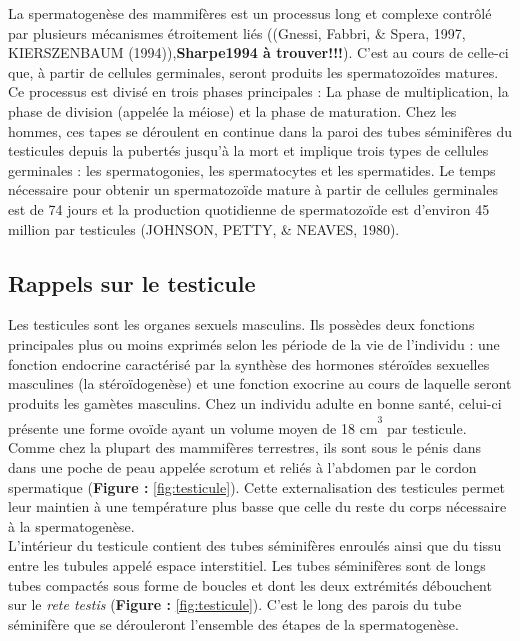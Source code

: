 \documentclass[12pt,twoside]{reedthesis}
\theoremstyle{definition}
\theoremstyle{definition}
\theoremstyle{remark}
\begin{document}
  La spermatogenèse des mammifères est un processus long et complexe
  contrôlé par plusieurs mécanismes étroitement liés ((Gnessi, Fabbri, \&
  Spera, 1997, KIERSZENBAUM (1994)),\textbf{Sharpe1994 à trouver!!!}).
  C'est au cours de celle-ci que, à partir de cellules germinales, seront
  produits les spermatozoïdes matures. Ce processus est divisé en trois
  phases principales : La phase de multiplication, la phase de division
  (appelée la méiose) et la phase de maturation. Chez les hommes, ces
  tapes se déroulent en continue dans la paroi des tubes séminifères du
  testicules depuis la pubertés jusqu'à la mort et implique trois types de
  cellules germinales : les spermatogonies, les spermatocytes et les
  spermatides. Le temps nécessaire pour obtenir un spermatozoïde mature à
  partir de cellules germinales est de 74 jours et la production
  quotidienne de spermatozoïde est d'environ 45 million par testicules
  (JOHNSON, PETTY, \& NEAVES, 1980).
  
  \subsection{Rappels sur le testicule}\label{rappels-sur-le-testicule}
  
  Les testicules sont les organes sexuels masculins. Ils possèdes deux
  fonctions principales plus ou moins exprimés selon les période de la vie
  de l'individu : une fonction endocrine caractérisé par la synthèse des
  hormones stéroïdes sexuelles masculines (la stéroïdogenèse) et une
  fonction exocrine au cours de laquelle seront produits les gamètes
  masculins. Chez un individu adulte en bonne santé, celui-ci présente une
  forme ovoïde ayant un volume moyen de 18
  cm\textsuperscript{\textsuperscript{3}} par testicule. Comme chez la
  plupart des mammifères terrestres, ils sont sous le pénis dans dans une
  poche de peau appelée scrotum et reliés à l'abdomen par le cordon
  spermatique (\textbf{Figure :} \ref{fig:testicule}). Cette
  externalisation des testicules permet leur maintien à une température
  plus basse que celle du reste du corps nécessaire à la spermatogenèse.\\
  L'intérieur du testicule contient des tubes séminifères enroulés ainsi
  que du tissu entre les tubules appelé espace interstitiel. Les tubes
  séminifères sont de longs tubes compactés sous forme de boucles et dont
  les deux extrémités débouchent sur le \emph{rete testis} (\textbf{Figure
  :} \ref{fig:testicule}). C'est le long des parois du tube séminifère que
  se dérouleront l'ensemble des étapes de la spermatogenèse.
  
\end{document}
